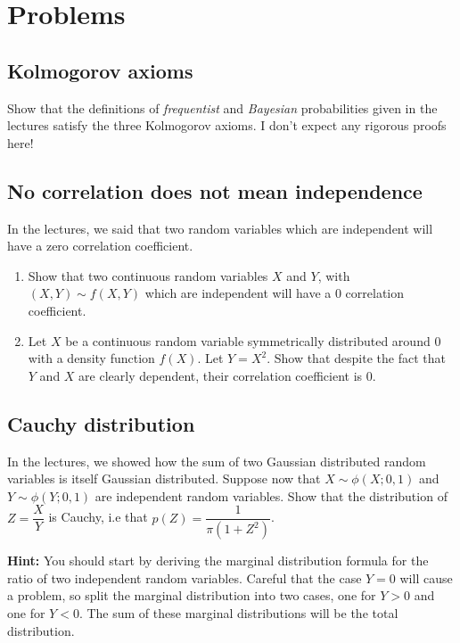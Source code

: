 \section{Problems}

\subsection{Kolmogorov axioms}

Show that the definitions of \emph{frequentist} and \emph{Bayesian} probabilities given in the lectures satisfy the three Kolmogorov axioms. I don't expect any rigorous proofs here!

\subsection{No correlation does not mean independence}

In the lectures, we said that two random variables which are independent will have a zero correlation coefficient. 

\begin{enumerate}
    \item Show that two continuous random variables $X$ and $Y$, with $(X,Y)\sim f(X,Y)$ which are independent will have a 0 correlation coefficient. 
    \item Let $X$ be a continuous random variable symmetrically distributed around 0 with a density function $f(X)$. Let $Y=X^{2}$. Show that despite the fact that $Y$ and $X$ are clearly dependent, their correlation coefficient is 0. 
\end{enumerate}

\subsection{Cauchy distribution}

In the lectures, we showed how the sum of two Gaussian distributed random variables is itself Gaussian distributed. Suppose now that $X\sim \phi(X;0,1)$ and  $Y\sim \phi(Y;0,1)$ are independent random variables. Show that the distribution of $Z=\dfrac{X}{Y}$ is Cauchy, i.e that $p(Z) = \dfrac{1}{\pi(1+Z^2)}$.

\textbf{Hint:} You should start by deriving the marginal distribution formula for the ratio of two independent random variables. Careful that the case $Y=0$ will cause a problem, so split the marginal distribution into two cases, one for $Y>0$ and one for $Y<0$. The sum of these marginal distributions will be the total distribution. 

